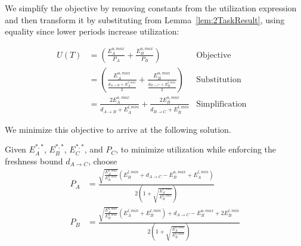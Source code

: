 We simplify the objective by removing constants from the utilization expression and then transform it by substituting from Lemma~\ref{lem:2TaskResult}, using equality since lower periods increase utilization:

\begin{align*}
	U(T) &= \left(\frac{E^{u,max}_A}{P_A} + \frac{E^{u,max}_B}{P_B}\right) &\mbox{Objective}&\\
	&= \left(\frac{E^{u,max}_A}{\frac{d_{A \to B} + E^{l,min}_A}{2}} + \frac{E^{u,max}_B}{\frac{d_{B \to C} + E^{l,min}_B}{2}}\right) &\mbox{Substitution}&\\
	&= \frac{2E^{u,max}_A}{d_{A \to B}+E^{l,min}_A} + \frac{2E^{u,max}_B}{d_{B \to C}+E^{l,min}_B} &\mbox{Simplification}&
\end{align*}

We minimize this objective to arrive at the following solution.

\begin{theorem}
	\label{thm:3TaskResult}
	Given $E^{*,*}_A$, $E^{*,*}_B$, $E^{*,*}_C$, and $P_C$, to minimize utilization while enforcing the freshness bound $d_{A \to C}$, choose
	\begin{align*}
		P_A &= \frac{\sqrt{\frac{E^{u,max}_A}{E^{u,max}_B}}(E^{l,min}_B+d_{A \to C}-E^{u,max}_B+E^{l,min}_A)}{2(1+\sqrt{\frac{E^{u,max}_A}{E^{u,max}_B}})}\\
		P_B &= \frac{\sqrt{\frac{E^{u,max}_A}{E^{u,max}_B}}(E^{l,min}_A+E^{l,min}_B)+d_{A \to C}-E^{u,max}_B+2E^{l,min}_B}{2(1+\sqrt{\frac{E^{u,max}_A}{E^{u,max}_B}})}
	\end{align*}
\end{theorem}

